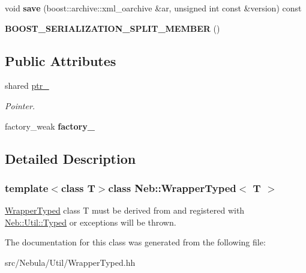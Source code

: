 \begin{DoxyCompactItemize}
\item 
\hypertarget{classNeb_1_1WrapperTyped_aeece54c65d4e1edab4d51225b0944a3c}{void {\bfseries save} (boost\-::archive\-::xml\-\_\-oarchive \&ar, unsigned int const \&version) const }\label{classNeb_1_1WrapperTyped_aeece54c65d4e1edab4d51225b0944a3c}

\item 
\hypertarget{classNeb_1_1WrapperTyped_a68f3e137a2c358c596f4358c3a15d1f8}{{\bfseries B\-O\-O\-S\-T\-\_\-\-S\-E\-R\-I\-A\-L\-I\-Z\-A\-T\-I\-O\-N\-\_\-\-S\-P\-L\-I\-T\-\_\-\-M\-E\-M\-B\-E\-R} ()}\label{classNeb_1_1WrapperTyped_a68f3e137a2c358c596f4358c3a15d1f8}

\end{DoxyCompactItemize}
\subsection*{Public Attributes}
\begin{DoxyCompactItemize}
\item 
\hypertarget{classNeb_1_1WrapperTyped_a92ba07879ca9c2072d7dd2b5acb9d7f5}{shared \hyperlink{classNeb_1_1WrapperTyped_a92ba07879ca9c2072d7dd2b5acb9d7f5}{ptr\-\_\-}}\label{classNeb_1_1WrapperTyped_a92ba07879ca9c2072d7dd2b5acb9d7f5}

\begin{DoxyCompactList}\small\item\em Pointer. \end{DoxyCompactList}\item 
\hypertarget{classNeb_1_1WrapperTyped_abd7867968e08d0ea4e3d681715e6684d}{factory\-\_\-weak {\bfseries factory\-\_\-}}\label{classNeb_1_1WrapperTyped_abd7867968e08d0ea4e3d681715e6684d}

\end{DoxyCompactItemize}


\subsection{Detailed Description}
\subsubsection*{template$<$class T$>$class Neb\-::\-Wrapper\-Typed$<$ T $>$}

\hyperlink{classNeb_1_1WrapperTyped}{Wrapper\-Typed} class T must be derived from and registered with \hyperlink{classNeb_1_1Util_1_1Typed}{Neb\-::\-Util\-::\-Typed} or exceptions will be thrown. 

The documentation for this class was generated from the following file\-:\begin{DoxyCompactItemize}
\item 
src/\-Nebula/\-Util/Wrapper\-Typed.\-hh\end{DoxyCompactItemize}
